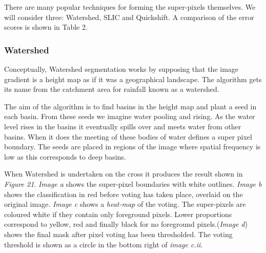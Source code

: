 \documentclass[12pt]{IIBproject}
\begin{document}
There are many popular techniques for forming the super-pixels themselves. We will consider three: Watershed, SLIC and Quickshift. A comparison of the error scores is shown in Table 2.



\subsubsection{Watershed}
Conceptually, Watershed segmentation works by supposing that the image gradient is a height map as if it was a geographical landscape. The algorithm gets its name from the catchment area for rainfall known as a watershed. 

The aim of the algorithm is to find basins in the height map and plant a seed in each basin. From these seeds we imagine water pooling and rising. As the water level rises in the basins it eventually spills over and meets water from other basins. When it does the meeting of these bodies of water defines a super pixel boundary. The seeds are placed in regions of the image where spatial frequency is low as this corresponds to deep basins.
 
When Watershed is undertaken on the cross it produces the result shown in \emph{Figure 21}. \emph{Image a} shows the super-pixel boundaries with white outlines. \emph{Image b} shows the classification in red before voting has taken place, overlaid on the original image. \emph{Image c} shows a \emph{heat-map} of the voting. The super-pixels are coloured white if they contain only foreground pixels. Lower proportions correspond to yellow, red and finally black for no foreground pixels.(\emph{Image d}) shows the final mask after pixel voting has been thresholded. The voting threshold is shown as a circle in the bottom right of \emph{image c.ii}.
\end{document}
